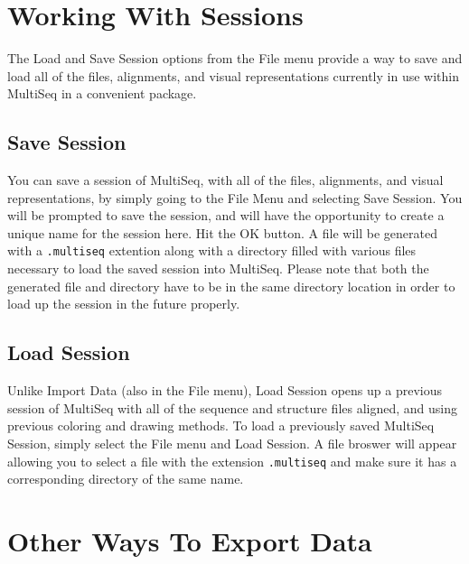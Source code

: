 \label{unit9}

\section{Working With Sessions}
The \textsf{Load} and \textsf{Save Session} options from the
\textsf{File} menu provide a way to save and load all of the files,
alignments, and visual representations currently in use within MultiSeq
in a convenient package.  

\subsection{Save Session}
You can save a session of MultiSeq, with all of the files, alignments,
and visual representations, by simply going to the \textsf{File Menu}
and selecting \textsf{Save Session}.  You will be prompted to save the
session, and will have the opportunity to create a unique name for the
session here.  Hit the \textsf{OK} button.  A file will be generated
with a \texttt{.multiseq} extention along with a directory filled with
various files necessary to load the saved session into MultiSeq.  Please
note that both the generated file and directory have to be in the same
directory location in order to load up the session in the future
properly.  

\subsection{Load Session}
Unlike \textsf{Import Data} (also in the \textsf{File} menu),
\textsf{Load Session} opens up a previous session of MultiSeq with all
of the sequence and structure files aligned, and using previous coloring
and drawing methods.  To load a previously saved MultiSeq Session,
simply select the \textsf{File} menu and \textsf{Load Session}.  A file
broswer will appear allowing you to select a file with the extension
\texttt{.multiseq} and make sure it has a corresponding directory of the
same name.

\section{Other Ways To Export Data}

